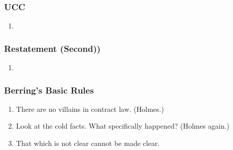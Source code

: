 
\subsubsection{UCC}

\begin{enumerate}
    \item %
\end{enumerate}

\subsubsection{Restatement (Second))}

\begin{enumerate}
    \item %
\end{enumerate}

\subsubsection{Berring's Basic Rules}

\begin{enumerate}
    \item There are no villains in contract law. (Holmes.)
    \item Look at the cold facts. What specifically happened? (Holmes again.)
    \item That which is not clear cannot be made clear.
\end{enumerate}
